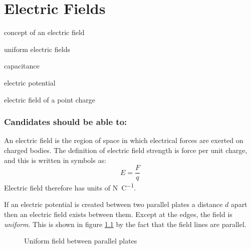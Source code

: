 \documentclass[revision-guide.tex]{subfiles}
\begin{document}
\chapter{Electric Fields}
\begin{content}
  \item concept of an electric field
  \item uniform electric fields
  \item capacitance
  \item electric potential
  \item electric field of a point charge
\end{content}
\subsection{Candidates should be able to:}

An electric field is the region of space in which electrical forces are exerted on charged bodies. The definition of electric field strength is force per unit charge, and this is written in symbols as:
\[ E=\frac{F}{q} \]
Electric field therefore has units of \si{\newton\per\coulomb}.


If an electric potential is created between two parallel plates a distance $d$ apart then an electric field exists between them. Except at the edges, the field is \emph{uniform}. This is shown in figure \ref{parallelplates} by the fact that the field lines are parallel.

\begin{figure}[ht]
  \begin{center}
  \end{center}
  \caption{Uniform field between parallel plates}
  \label{parallelplates}
\end{figure}
\end{document}
